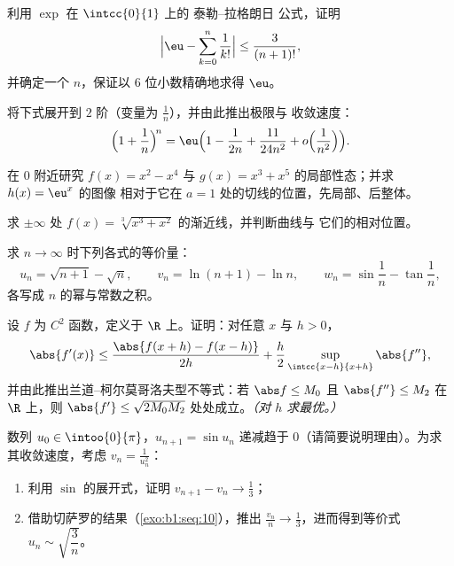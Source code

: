 \begin{exercise}[$\star$]\label{exo:b1:taylor:4}
利用 $\exp$ 在 $\intcc{0}{1}$ 上的 泰勒–拉格朗日 公式，证明
\[
\Bigl| \eu - \sum_{k=0}^{n} \frac{1}{k!} \Bigr| \leq
\frac{3}{(n+1)!},
\]
并确定一个 $n$，保证以 $6$ 位小数精确地求得 $\eu$。
\end{exercise}

\begin{exercise}[$\star\star$]\label{exo:b1:taylor:5}
将下式展开到 $2$ 阶（变量为 $\frac1n$），并由此推出极限与
收敛速度：
\[
\Bigl(1 + \frac 1n\Bigr)^{\!n}
= \eu\Bigl(1 - \frac{1}{2n} + \frac{11}{24n^2} +
o\Bigl(\frac{1}{n^2}\Bigr)\Bigr).
\]
\end{exercise}

\begin{exercise}[$\star\star$]\label{exo:b1:taylor:6}
在 $0$ 附近研究 $f(x) = x^2 - x^4$ 与 $g(x) =
x^3 + x^5$ 的局部性态；并求 $h(x) = \eu^x$ 的图像
相对于它在 $a = 1$ 处的切线的位置，先局部、后整体。
\end{exercise}

\begin{exercise}[$\star\star$]\label{exo:b1:taylor:7}
求 $\pm\infty$ 处 $f(x) =
\sqrt[3]{x^3 + x^2}$ 的渐近线，并判断曲线与
它们的相对位置。
\end{exercise}

\begin{exercise}[$\star\star$]\label{exo:b1:taylor:8}
求 $n \to \infty$ 时下列各式的等价量：
\[
u_n = \sqrt{n+1} - \sqrt n, \qquad
v_n = \ln(n+1) - \ln n, \qquad
w_n = \sin\frac{1}{n} - \tan\frac{1}{n},
\]
各写成 $n$ 的幂与常数之积。
\end{exercise}

\begin{exercise}[$\star\star\star$]\label{exo:b1:taylor:9}
设 $f$ 为 $C^2$ 函数，定义于 $\R$ 上。证明：对任意 $x$ 与 $h > 0$，
\[
\abs{f'(x)} \leq \frac{\abs{f(x+h) - f(x-h)}}{2h} +
\frac{h}{2}\sup_{\intcc{x-h}{x+h}}\abs{f''} ,
\]
并由此推出兰道--柯尔莫哥洛夫型不等式：若 $\abs f \leq
M_0$ 且 $\abs{f''} \leq M_2$ 在 $\R$ 上，则 $\abs{f'} \leq
\sqrt{2 M_0 M_2}$ 处处成立。\emph{（对 $h$ 求最优。）}
\end{exercise}

\begin{exercise}[$\star\star\star$]\label{exo:b1:taylor:10}
数列 $u_0 \in \intoo{0}{\pi}$，$u_{n+1} = \sin u_n$
递减趋于 $0$（请简要说明理由）。为求其收敛速度，考虑 $v_n
= \frac{1}{u_n^2}$：
\begin{enumerate}
  \item 利用 $\sin$ 的展开式，证明 $v_{n+1} - v_n \to
        \frac13$；
  \item 借助切萨罗的结果（\cref{exo:b1:seq:10}），推出 $\frac{v_n}{n}
        \to \frac13$，进而得到等价式 $u_n \sim
        \sqrt{\dfrac{3}{n}}$。
\end{enumerate}
\end{exercise}

